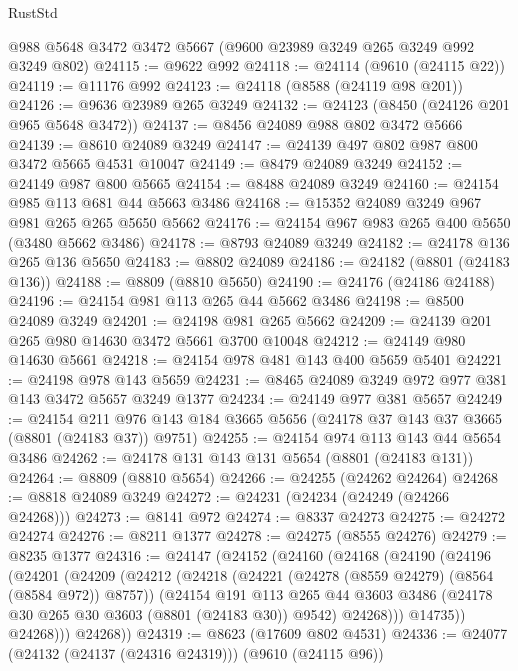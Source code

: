 \begin{lexlean}{RustStd}
\begin{coremodule}
    @988
    @5648
    @3472
    @3472
    @5667
    (@9600 @23989 @3249 @265 @3249 @992 @3249 @802)
@24115 := @9622 @992
@24118 := @24114 (@9610 (@24115 @22))
@24119 := @11176 @992
@24123 := @24118 (@8588 (@24119 @98 @201))
@24126 := @9636 @23989 @265 @3249
@24132 := @24123 (@8450 (@24126 @201 @965 @5648 @3472))
@24137 := @8456 @24089 @988 @802 @3472 @5666
@24139 := @8610 @24089 @3249
@24147 := @24139 @497 @802 @987 @800 @3472 @5665 @4531 @10047
@24149 := @8479 @24089 @3249
@24152 := @24149 @987 @800 @5665
@24154 := @8488 @24089 @3249
@24160 := @24154 @985 @113 @681 @44 @5663 @3486
@24168 := @15352 @24089 @3249 @967 @981 @265 @265 @5650 @5662
@24176 := @24154 @967 @983 @265 @400 @5650 (@3480 @5662 @3486)
@24178 := @8793 @24089 @3249
@24182 := @24178 @136 @265 @136 @5650
@24183 := @8802 @24089
@24186 := @24182 (@8801 (@24183 @136))
@24188 := @8809 (@8810 @5650)
@24190 := @24176 (@24186 @24188)
@24196 := @24154 @981 @113 @265 @44 @5662 @3486
@24198 := @8500 @24089 @3249
@24201 := @24198 @981 @265 @5662
@24209 := @24139 @201 @265 @980 @14630 @3472 @5661 @3700 @10048
@24212 := @24149 @980 @14630 @5661
@24218 := @24154 @978 @481 @143 @400 @5659 @5401
@24221 := @24198 @978 @143 @5659
@24231 := @8465 @24089 @3249 @972 @977 @381 @143 @3472 @5657 @3249 @1377
@24234 := @24149 @977 @381 @5657
@24249 := @24154
    @211
    @976
    @143
    @184
    @3665
    @5656
    (@24178 @37 @143 @37 @3665 (@8801 (@24183 @37)) @9751)
@24255 := @24154 @974 @113 @143 @44 @5654 @3486
@24262 := @24178 @131 @143 @131 @5654 (@8801 (@24183 @131))
@24264 := @8809 (@8810 @5654)
@24266 := @24255 (@24262 @24264)
@24268 := @8818 @24089 @3249
@24272 := @24231 (@24234 (@24249 (@24266 @24268)))
@24273 := @8141 @972
@24274 := @8337 @24273
@24275 := @24272 @24274
@24276 := @8211 @1377
@24278 := @24275 (@8555 @24276)
@24279 := @8235 @1377
@24316 := @24147
    (@24152
      (@24160
        (@24168
          (@24190
            (@24196
              (@24201
                (@24209
                  (@24212
                    (@24218
                      (@24221 (@24278 (@8559 @24279) (@8564 (@8584 @972)) @8757))
                      (@24154
                        @191
                        @113
                        @265
                        @44
                        @3603
                        @3486
                        (@24178 @30 @265 @30 @3603 (@8801 (@24183 @30)) @9542)
                        @24268)))
                  @14735))
              @24268)))
        @24268))
@24319 := @8623 (@17609 @802 @4531)
@24336 := @24077
    (@24132 (@24137 (@24316 @24319)))
    (@9610 (@24115 @96))

\end{coremodule}
\end{lexlean}
